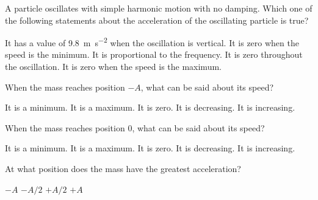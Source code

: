 \documentclass{../../../oss-ap12ibhl-print}
\begin{document}
\begin{questions}
  \question A particle oscillates with simple harmonic motion with no damping.
  Which one of the following statements about the acceleration of the
  oscillating particle is true?
  \begin{choices}
    \choice It has a value of \SI{9.8}{\metre\per\second\squared} when the
    oscillation is vertical.
    \choice It is zero when the speed is the minimum.
    \choice It is proportional to the frequency.
    \choice It is zero throughout the oscillation.
    \choice It is zero when the speed is the maximum.
  \end{choices}
  \newpage
  
  
  \question When the mass reaches position $-A$, what can be said about its
  speed?
  \label{one}
  \begin{choices}
    \choice It is a minimum.
    \choice It is a maximum.
    \choice It is zero.
    \choice It is decreasing.
    \choice It is increasing.
  \end{choices}
  
  \question When the mass reaches position 0, what can be said about its speed?
  \begin{choices}
    \choice It is a minimum.
    \choice It is a maximum.
    \choice It is zero.
    \choice It is decreasing.
    \choice It is increasing.
  \end{choices}
    
  \question At what position does the mass have the greatest acceleration?
  \begin{choices}
    \choice $-A$
    \choice $-A/2$
    \choice $+A/2$
    \choice $+A$
  \end{choices}
    

\end{questions}
\end{document}
